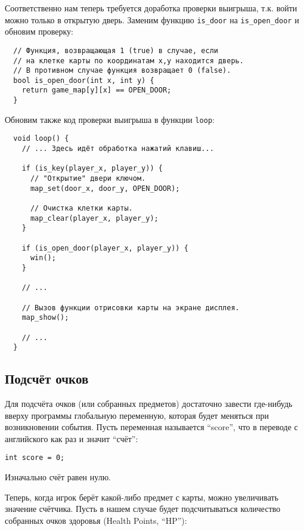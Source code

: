 \documentclass[../sparc.tex]{subfiles}
\begin{document}
Соответственно нам теперь требуется доработка проверки выигрыша, т.к. войти
можно только в открытую дверь.  Заменим функцию \texttt{is\_door} на
\texttt{is\_open\_door} и обновим проверку:

\begin{verbatim}
  // Функция, возвращающая 1 (true) в случае, если
  // на клетке карты по координатам x,y находится дверь.
  // В противном случае функция возвращает 0 (false).
  bool is_open_door(int x, int y) {
    return game_map[y][x] == OPEN_DOOR;
  }
\end{verbatim}

Обновим также код проверки выигрыша в функции \texttt{loop}:

\begin{verbatim}
  void loop() {
    // ... Здесь идёт обработка нажатий клавиш...

    if (is_key(player_x, player_y)) {
      // "Открытие" двери ключом.
      map_set(door_x, door_y, OPEN_DOOR);

      // Очистка клетки карты.
      map_clear(player_x, player_y);
    }

    if (is_open_door(player_x, player_y)) {
      win();
    }

    // ...

    // Вызов функции отрисовки карты на экране дисплея.
    map_show();

    // ...
  }
\end{verbatim}

\subsection{Подсчёт очков}

Для подсчёта очков (или собранных предметов) достаточно завести где-нибудь
вверху программы глобальную переменную, которая будет меняться при возникновении
события.  Пусть переменная называется ``score'', что в переводе с английского
как раз и значит ``счёт'':

\begin{verbatim}
int score = 0;
\end{verbatim}

Изначально счёт равен нулю.

Теперь, когда игрок берёт какой-либо предмет с карты, можно увеличивать значение
счётчика.  Пусть в нашем случае будет подсчитываться количество собранных очков
здоровья (Health Points, ``HP''):
\end{document}
